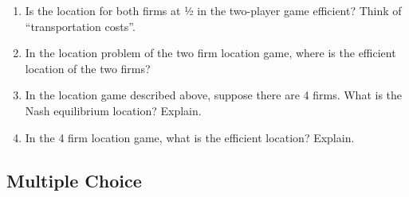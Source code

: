 \documentclass[
]{book}
\providecommand{\tightlist}{%
  \setlength{\itemsep}{0pt}\setlength{\parskip}{0pt}}
\begin{document}
\begin{enumerate}
\def\labelenumi{\arabic{enumi}.}
\tightlist
\item
  Is the location for both firms at ½ in the two-player game efficient? Think of ``transportation costs''.
\item
  In the location problem of the two firm location game, where is the efficient location of the two firms?
\item
  In the location game described above, suppose there are 4 firms. What is the Nash equilibrium location? Explain.
\item
  In the 4 firm location game, what is the efficient location? Explain.
\end{enumerate}

\hypertarget{multiple-choice-9}{%
\subsection{Multiple Choice}\label{multiple-choice-9}}
\end{document}
